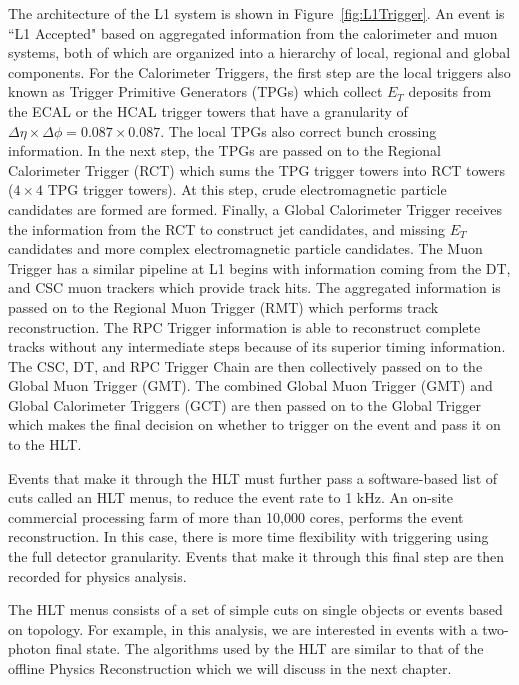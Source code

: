 The architecture of the L1 system is shown in Figure~\ref{fig:L1Trigger}. An event is ``L1 Accepted" based on aggregated information from the calorimeter and muon systems, both of which are organized into a hierarchy of local, regional and global components. For the Calorimeter Triggers, the first step are the local triggers also known as Trigger Primitive Generators (TPGs) which collect $E_{T}$ deposits from the ECAL or the HCAL trigger towers that have a granularity of $\Delta \eta \times \Delta \phi= 0.087 \times 0.087$. The local TPGs also correct bunch crossing information. In the next step, the TPGs are passed on to the Regional Calorimeter Trigger (RCT) which sums the TPG trigger towers into RCT towers ($4 \times 4$ TPG trigger towers). At this step, crude electromagnetic particle candidates are formed are formed. Finally, a Global Calorimeter Trigger receives the information from the RCT to construct jet candidates, and missing $E_{T}$ candidates and more complex electromagnetic particle candidates. The Muon Trigger has a similar pipeline at L1 begins with information coming from the DT, and CSC muon trackers which provide track hits. The aggregated information is passed on to the Regional Muon Trigger (RMT) which performs track reconstruction. The RPC Trigger information is able to reconstruct complete tracks without any intermediate steps because of its superior timing information. The CSC, DT, and RPC  Trigger Chain are then collectively passed on to the Global Muon Trigger (GMT). The combined Global Muon Trigger (GMT) and Global Calorimeter Triggers (GCT) are then passed on to the Global Trigger which makes the final decision on whether to trigger on the event and pass it on to the HLT.

Events that make it through the HLT must further pass a software-based list of cuts called an HLT menus, to reduce the event rate to 1 kHz. An on-site commercial processing farm of more than 10,000 cores, performs the event reconstruction. In this case, there is more time flexibility with triggering using the full detector granularity. Events that make it through this final step are then recorded for physics analysis. 

\nowidow
The HLT menus consists of a set of simple cuts on single objects or events based on topology. For example, in this analysis, we are interested in events with a two-photon final state. The algorithms used by the HLT are similar to that of the offline Physics Reconstruction which we will discuss in the next chapter. 

